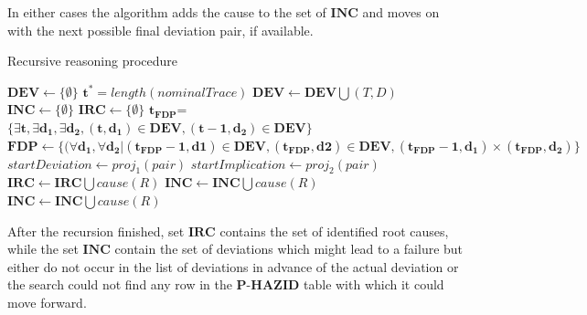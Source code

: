 \documentclass[conference]{IEEEtran}
\begin{document}
In either cases the algorithm adds the cause to the set of $\mathbf{INC}$ and moves on with the next possible final deviation pair, if available.

\begin{algorithm*}
\caption{Recursive reasoning procedure}
\label{alg:main}
\begin{algorithmic}[1]
\State $\mathbf{DEV} \leftarrow \{ \emptyset \}$
\State $\mathbf{t^*}=length(nominalTrace)$
\State $\mathbf{DEV} \leftarrow \mathbf{DEV} \bigcup (T,D)$
\EndFor
\EndFor
\State $\mathbf{INC} \leftarrow \{ \emptyset \}$
\State $\mathbf{IRC} \leftarrow \{ \emptyset \}$
\State $\mathbf{t_{FDP}}$=$\{ \exists \mathbf{t}, \exists \mathbf{d_1}, \exists \mathbf{d_2}, (\mathbf{t},\mathbf{d_1}) \in \mathbf{DEV}, (\mathbf{t-1},\mathbf{d_2}) \in \mathbf{DEV} \}$
\State $\mathbf{FDP} \leftarrow \{(\forall \mathbf{d_1},\forall \mathbf{d_2} | (\mathbf{t_{FDP}-1},\mathbf{d1}) \in \mathbf{DEV},(\mathbf{t_{FDP}},\mathbf{d2}) \in \mathbf{DEV}, (\mathbf{t_{FDP}-1},\mathbf{d_1}) \times (\mathbf{t_{FDP}},\mathbf{d_2}) \}$ 
  \State $startDeviation \leftarrow proj_1(pair)$
  \State $startImplication \leftarrow proj_2(pair)$
  \State {}
\EndFor
{}
     \State $\mathbf{IRC} \leftarrow \mathbf{IRC} \bigcup cause(R)$
     \State \Return
   \Else
          	\State {}
     \Else
      \State $\mathbf{INC} \leftarrow \mathbf{INC} \bigcup cause(R)$
      \State \Return
     \EndIf
   \EndIf
 \EndFor
\Else
\State $\mathbf{INC} \leftarrow \mathbf{INC} \bigcup cause(R)$
      \State \Return
\EndIf
\EndProcedure
\end{algorithmic}
\end{algorithm*}

After the recursion finished, set $\mathbf{IRC}$ contains the set of identified root causes, while the set
$\mathbf{INC}$ contain the set of deviations which might lead to a failure but either do not occur in the list
of deviations in advance of the actual deviation or the search could not find any row in the $\textbf{P-HAZID}$ table with which it could move forward.
\end{document}
